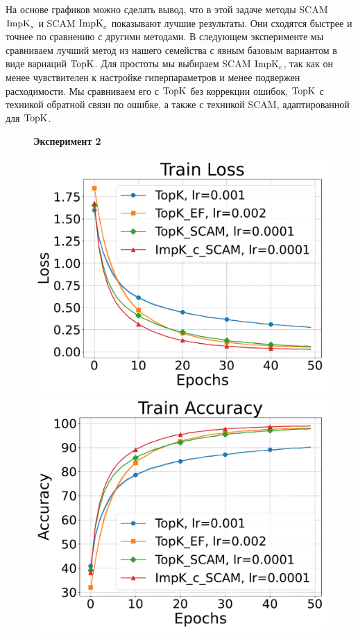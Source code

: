     На основе графиков можно сделать вывод, что в этой задаче методы SCAM $\operatorname{ImpK}_s$ и SCAM $\operatorname{ImpK}_c$ показывают лучшие результаты. Они сходятся быстрее и точнее по сравнению с другими методами. В следующем эксперименте мы сравниваем лучший метод из нашего семейства с явным базовым вариантом в виде вариаций $\operatorname{TopK}$. Для простоты мы выбираем SCAM $\operatorname{ImpK}_c$, так как он менее чувствителен к настройке гиперпараметров и менее подвержен расходимости. Мы сравниваем его с $\operatorname{TopK}$ без коррекции ошибок, $\operatorname{TopK}$ с техникой обратной связи по ошибке, а также с техникой SCAM, адаптированной для $\operatorname{TopK}$.
    \begin{figure}[ht]
        \centering
        \textbf{Эксперимент 2}\par\medskip
        \begin{minipage}{0.45\textwidth}
            \includegraphics[width=\textwidth]{figures/resnet/experiment2/Train Loss.pdf}
        \end{minipage}
        \begin{minipage}{0.45\textwidth}
            \includegraphics[width=\textwidth]{figures/resnet/experiment2/Train Accuracy.pdf}

\end{minipage}
\end{figure}
